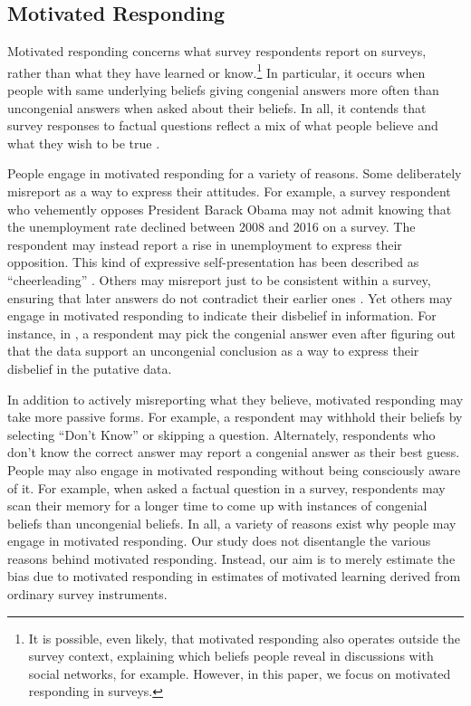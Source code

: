 \documentclass[12pt, letterpaper]{article}
\begin{document}
\subsection*{Motivated Responding}

Motivated responding concerns what survey respondents report on surveys, rather than what they have learned or know.\footnote{It is possible, even likely, that motivated responding also operates outside the survey context, explaining which beliefs people reveal in discussions with social networks, for example. However, in this paper, we focus on motivated responding in surveys.} In particular, it occurs when people with same underlying beliefs giving congenial answers more often than uncongenial answers when asked about their beliefs. In all, it contends that survey responses to factual questions reflect a mix of what people believe and what they wish to be true \citep{luskin2013, prior2015}.

People engage in motivated responding for a variety of reasons. Some deliberately misreport as a way to express their attitudes. For example, a survey respondent who vehemently opposes President Barack Obama may not admit knowing that the unemployment rate declined between 2008 and 2016 on a survey. The respondent may instead report a rise in unemployment to express their opposition. This kind of expressive self-presentation has been described as ``cheerleading'' \citep[e.g.,][]{gerber2009}. Others may misreport just to be consistent within a survey, ensuring that later answers do not contradict their earlier ones \citep[e.g.,][]{sears1983, lau1990, wilcox1993, palmer2001}. Yet others may engage in motivated responding to indicate their disbelief in information. For instance, in \citet{kahan2017}, a respondent may pick the congenial answer even after figuring out that the data support an uncongenial conclusion as a way to express their disbelief in the putative data.

In addition to actively misreporting what they believe, motivated responding may take more passive forms. For example, a respondent may withhold their beliefs by selecting ``Don't Know'' or skipping a question. Alternately, respondents who don't know the correct answer may report a congenial answer as their best guess. People may also engage in motivated responding without being consciously aware of it. For example, when asked a factual question in a survey, respondents may scan their memory for a longer time to come up with instances of congenial beliefs than uncongenial beliefs. In all, a variety of reasons exist why people may engage in motivated responding. Our study does not disentangle the various reasons behind motivated responding. Instead, our aim is to merely estimate the bias due to motivated responding in estimates of motivated learning derived from ordinary survey instruments.
\end{document}
